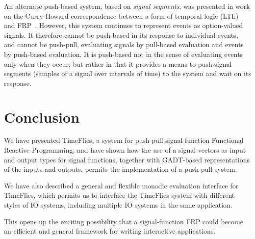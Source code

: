 \documentclass[draft]{llncs}
\begin{document}
An alternate push-based system, based on {\em signal segments}, was presented in
work on the Curry-Howard correspondence between a form of temporal logic (LTL)
and FRP~\cite{Jeffrey2012}. However, this system continues to represent events
as option-valued signals. It therefore cannot be push-based in its response to
individual events, and cannot be push-pull, evaluating signals by pull-based
evaluation and events by push-based evaluation. It is push-based not in the
sense of evaluating events only when they occur, but rather in that it provides
a means to push signal segments (samples of a signal over intervals of time) to
the system and wait on its response.

\section{Conclusion}
\label{section:Conclusion}

We have presented TimeFlies, a system for push-pull signal-function Functional
Reactive Programming, and have shown how the use of a signal vectors as input
and output types for signal functions, together with GADT-based representations
of the inputs and outputs, permits the implementation of a push-pull system.

We have also described a general and flexible monadic evaluation interface for
TimeFlies, which permits us to interface the TimeFlies system with different
styles of IO systems, including multiple IO systems in the same application.

This opens up the exciting possibility that a signal-function FRP could become
an efficient and general framework for writing interactive applications.



\end{document}
